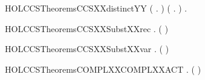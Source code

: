 \begin{SaveVerbatim}{HOLCCSTheoremsCCSXXdistinctYY}
   (\HOLSymConst{\HOLTokenForall{}}   .    \HOLSymConst{\HOLTokenNotEqual{}} \HOLConst{\ensuremath{\nu}}  ) \HOLSymConst{\HOLTokenConj{}}
   (\HOLSymConst{\HOLTokenForall{}}   .    \HOLSymConst{\HOLTokenNotEqual{}} \HOLConst{\ensuremath{\nu}}  ) \HOLSymConst{\HOLTokenConj{}}
   \HOLSymConst{\HOLTokenForall{}}   .    \HOLSymConst{\HOLTokenNotEqual{}}   
\end{SaveVerbatim}
\newcommand{\HOLCCSTheoremsCCSXXdistinctYY}{\UseVerbatim{HOLCCSTheoremsCCSXXdistinctYY}}
\begin{SaveVerbatim}{HOLCCSTheoremsCCSXXSubstXXrec}
\HOLTokenTurnstile{} \HOLSymConst{\HOLTokenForall{}}  .  (  )   \HOLSymConst{=}   
\end{SaveVerbatim}
\newcommand{\HOLCCSTheoremsCCSXXSubstXXrec}{\UseVerbatim{HOLCCSTheoremsCCSXXSubstXXrec}}
\begin{SaveVerbatim}{HOLCCSTheoremsCCSXXSubstXXvar}
\HOLTokenTurnstile{} \HOLSymConst{\HOLTokenForall{}} .  ( )   \HOLSymConst{=} 
\end{SaveVerbatim}
\newcommand{\HOLCCSTheoremsCCSXXSubstXXvar}{\UseVerbatim{HOLCCSTheoremsCCSXXSubstXXvar}}
\begin{SaveVerbatim}{HOLCCSTheoremsCOMPLXXCOMPLXXACT}
\HOLTokenTurnstile{} \HOLSymConst{\HOLTokenForall{}}.  ( ) \HOLSymConst{=} 
\end{SaveVerbatim}
